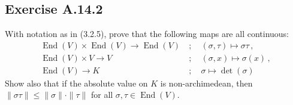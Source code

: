 \documentclass[12pt, a4paper]{article}
\begin{document}
\subsection*{Exercise A.14.2}
With notation as in (3.2.5), prove that the following maps are all continuous:
\begin{align*}
    \operatorname{End}(V) \times \operatorname{End}(V) \longrightarrow \operatorname{End}(V) \ &; \quad (\sigma, \tau) \longmapsto \sigma\tau \,, \\
    \operatorname{End}(V) \times V \longrightarrow V \ &; \quad (\sigma, x) \longmapsto \sigma(x) \,, \\
    \operatorname{End}(V) \longrightarrow K \ &; \quad \sigma \longmapsto \det(\sigma)
\end{align*}
Show also that if the absolute value on $K$ is non-archimedean, then $\| \sigma\tau \| \le \| \sigma \| \cdot \| \tau \|$ for all $\sigma, \tau \in \operatorname{End}(V)$.
\end{document}
